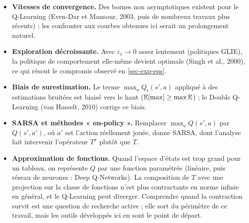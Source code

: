 \begin{itemize}
\item \textbf{Vitesses de convergence.} Des bornes non asymptotiques existent pour le Q-Learning (Even-Dar et Mansour, 2003, puis de nombreux travaux plus récents) ; les confronter aux courbes obtenues ici serait un prolongement naturel.
\item \textbf{Exploration décroissante.} Avec $\varepsilon_t\to0$ assez lentement (politiques GLIE), la politique de comportement elle-même devient optimale (Singh et al., 2000), ce qui résout le compromis observé en \cref{sec-exp-eps}.
\item \textbf{Biais de surestimation.} Le terme $\max_aQ_t(s',a)$ appliqué à des estimations bruitées est biaisé vers le haut ($\mathbb{E}[\max]\ge\max\mathbb{E}$) ; le Double Q-Learning (van Hasselt, 2010) corrige ce biais.
\item \textbf{SARSA et méthodes « on-policy ».} Remplacer $\max_aQ(s',a)$ par $Q(s',a')$, où $a'$ est l'action réellement jouée, donne SARSA, dont l'analyse fait intervenir l'opérateur $T^\pi$ plutôt que $T$.
\item \textbf{Approximation de fonctions.} Quand l'espace d'états est trop grand pour un tableau, on représente $Q$ par une fonction paramétrée (linéaire, puis réseau de neurones : Deep Q-Networks). La composition de $T$ avec une projection sur la classe de fonctions n'est plus contractante en norme infinie en général, et le Q-Learning peut diverger. Comprendre quand la contraction survit est une question de recherche active ; elle sort du périmètre de ce travail, mais les outils développés ici en sont le point de départ.
\end{itemize}

